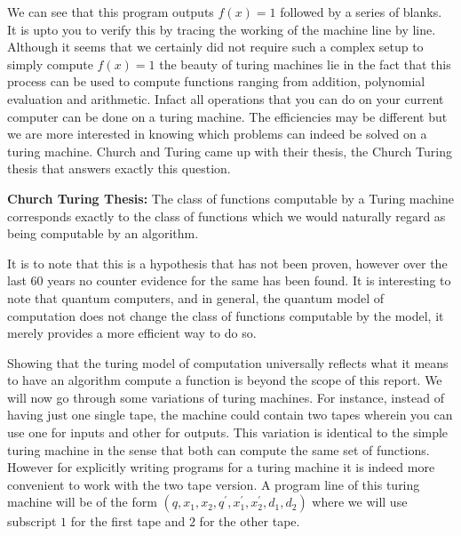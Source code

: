 We can see that this program outputs $f(x)=1$ followed by a series of blanks. It is upto you to verify this by tracing the working of the machine line by line.
Although it seems that we certainly did not require such a complex setup to simply compute $f(x) = 1$ the beauty of turing machines lie in the fact that this process can be used to compute functions ranging from addition, polynomial evaluation and arithmetic. Infact all operations that you can do on your current computer can be done on a turing machine. The efficiencies may be different but we are more interested in knowing which problems can indeed be solved on a turing machine.
Church and Turing came up with their thesis, the Church Turing thesis that answers exactly this question.
\begin{thesis}
\textbf{Church Turing Thesis:} The class of functions computable by a Turing machine corresponds exactly to the class of functions which we would naturally regard as being computable by an algorithm.
\end{thesis}
It is to note that this is a hypothesis that has not been proven, however over the last 60 years no counter evidence for the same has been found.
It is interesting to note that quantum computers, and in general, the quantum model of computation does not change the class of functions computable by the model, it merely provides a more efficient way to do so.

Showing that the turing model of computation universally reflects what it means to have an algorithm compute a function is beyond the scope of this report. We will now go through some variations of turing machines. For instance, instead of having just one single tape, the machine could contain two tapes wherein you can use one for inputs and other for outputs. This variation is identical to the simple turing machine in the sense that both can compute the same set of functions. However for explicitly writing programs for a turing machine it is indeed more convenient to work with the two tape version.
A program line of this turing machine will be of the form $\left(q, x_1, x_2, q^{'}, x_1^{'}, x_2^{'}, d_1, d_2 \right)$ where we will use subscript $1$ for the first tape and $2$ for the other tape.

